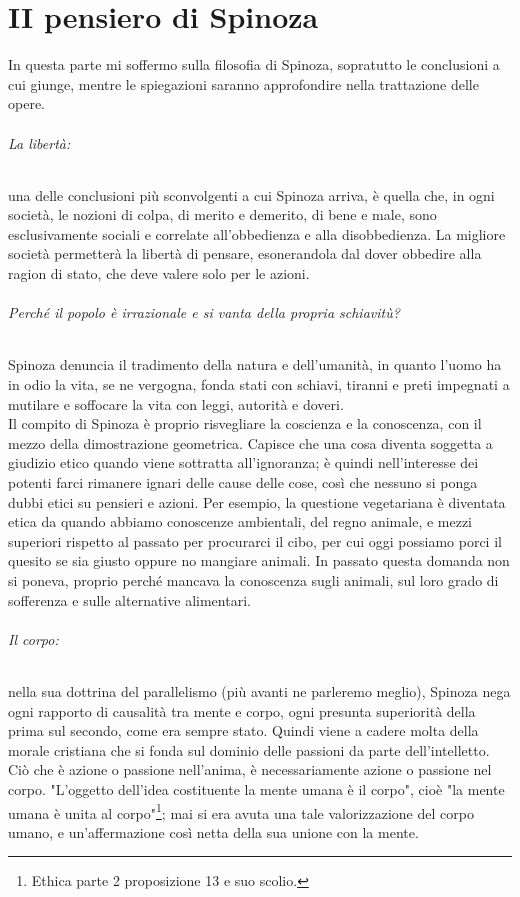 \chapter{II pensiero di Spinoza}
In questa parte mi soffermo sulla filosofia di Spinoza, sopratutto le conclusioni a cui giunge, mentre le spiegazioni saranno approfondire nella trattazione delle opere.
\subparagraph{La libertà:} una delle conclusioni più sconvolgenti a cui Spinoza arriva, è quella che, in ogni società, le nozioni di colpa, di merito e demerito, di bene e male, sono esclusivamente sociali e correlate all'obbedienza e alla disobbedienza. La migliore società  permetterà la libertà di pensare, esonerandola dal dover obbedire alla ragion di stato, che deve valere solo per le azioni.
\subparagraph{Perché il popolo è irrazionale e si vanta della propria schiavitù?} Spinoza denuncia il tradimento della natura e dell'umanità, in quanto l'uomo ha in odio la vita, se ne vergogna, fonda stati con schiavi, tiranni e preti impegnati a mutilare e soffocare la vita con leggi, autorità e doveri.\\
Il compito di Spinoza è proprio risvegliare la coscienza e la conoscenza, con il mezzo della dimostrazione geometrica. Capisce che una cosa diventa soggetta a giudizio etico quando viene sottratta all'ignoranza; è quindi nell'interesse dei potenti farci rimanere ignari delle cause delle cose, così che nessuno si ponga dubbi etici su pensieri e azioni. Per esempio, la questione vegetariana è diventata etica da quando abbiamo conoscenze ambientali, del regno animale, e mezzi superiori rispetto al passato per procurarci il cibo, per cui oggi possiamo porci il quesito se sia giusto oppure no mangiare animali. In passato questa domanda non si poneva, proprio perché mancava la conoscenza sugli animali, sul loro grado di sofferenza e sulle alternative alimentari.
\subparagraph{Il corpo:} nella sua dottrina del parallelismo (più avanti ne parleremo meglio), Spinoza nega ogni rapporto di causalità tra mente e corpo, ogni presunta superiorità della prima sul secondo, come era sempre stato. Quindi viene a cadere molta della morale cristiana che si fonda sul dominio delle passioni da parte dell'intelletto.\\
Ciò che è azione o passione nell'anima, è necessariamente azione o passione nel corpo. "L'oggetto dell'idea costituente la mente umana è il corpo", cioè "la mente umana è unita al corpo"\footnote{Ethica parte 2 proposizione 13 e suo scolio.}; mai si era avuta una tale valorizzazione del corpo umano, e un'affermazione così netta della sua unione con la mente.
